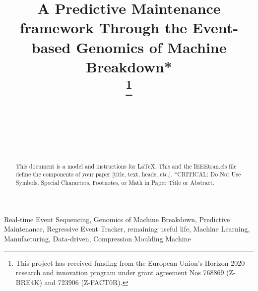 \documentclass[conference]{IEEEtran}
\begin{document}
\title{A Predictive Maintenance framework Through the Event-based Genomics of Machine Breakdown*\\
\thanks{This project has received funding from the European Union's Horizon 2020 research and innovation program under grant agreement Nos 768869 (Z-BRE4K) and 723906 (Z-FACT0R).}
}

\author{
\\
\and
{}
\\
\and
{}
\\
}

\maketitle
\thispagestyle{fancy}

\begin{abstract}
This document is a model and instructions for \LaTeX.
This and the IEEEtran.cls file define the components of your paper [title, text, heads, etc.]. *CRITICAL: Do Not Use Symbols, Special Characters, Footnotes,
or Math in Paper Title or Abstract.
\end{abstract}

\begin{IEEEkeywords}
Real-time Event Sequencing, Genomics of Machine Breakdown, Predictive Maintenance, Regressive Event Tracker, remaining useful life, Machine Learning, Manufacturing, Data-driven, Compression Moulding Machine
\end{IEEEkeywords}
\end{document}
